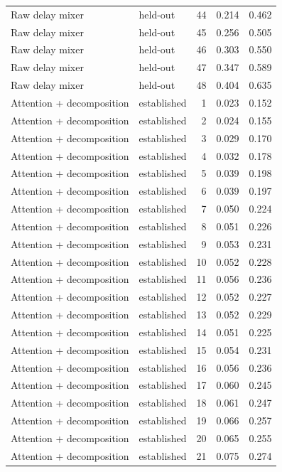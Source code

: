 \begin{tabular}{llrrr}
Raw delay mixer & held-out & 44 & 0.214 & 0.462 \\
Raw delay mixer & held-out & 45 & 0.256 & 0.505 \\
Raw delay mixer & held-out & 46 & 0.303 & 0.550 \\
Raw delay mixer & held-out & 47 & 0.347 & 0.589 \\
Raw delay mixer & held-out & 48 & 0.404 & 0.635 \\
Attention + decomposition & established & 1 & 0.023 & 0.152 \\
Attention + decomposition & established & 2 & 0.024 & 0.155 \\
Attention + decomposition & established & 3 & 0.029 & 0.170 \\
Attention + decomposition & established & 4 & 0.032 & 0.178 \\
Attention + decomposition & established & 5 & 0.039 & 0.198 \\
Attention + decomposition & established & 6 & 0.039 & 0.197 \\
Attention + decomposition & established & 7 & 0.050 & 0.224 \\
Attention + decomposition & established & 8 & 0.051 & 0.226 \\
Attention + decomposition & established & 9 & 0.053 & 0.231 \\
Attention + decomposition & established & 10 & 0.052 & 0.228 \\
Attention + decomposition & established & 11 & 0.056 & 0.236 \\
Attention + decomposition & established & 12 & 0.052 & 0.227 \\
Attention + decomposition & established & 13 & 0.052 & 0.229 \\
Attention + decomposition & established & 14 & 0.051 & 0.225 \\
Attention + decomposition & established & 15 & 0.054 & 0.231 \\
Attention + decomposition & established & 16 & 0.056 & 0.236 \\
Attention + decomposition & established & 17 & 0.060 & 0.245 \\
Attention + decomposition & established & 18 & 0.061 & 0.247 \\
Attention + decomposition & established & 19 & 0.066 & 0.257 \\
Attention + decomposition & established & 20 & 0.065 & 0.255 \\
Attention + decomposition & established & 21 & 0.075 & 0.274 \\

\end{tabular}
